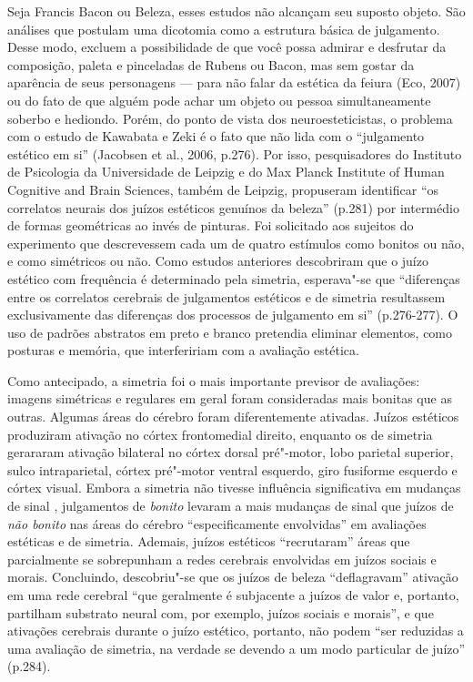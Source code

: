 Seja Francis Bacon ou Beleza, esses estudos não alcançam seu suposto
objeto. São análises que postulam uma dicotomia como a estrutura básica
de julgamento. Desse modo, excluem a possibilidade de que você possa
admirar e desfrutar da composição, paleta e pinceladas de Rubens ou
Bacon, mas sem gostar da aparência de seus personagens --- para não
falar da estética da feiura (Eco, 2007) ou do fato de que alguém pode
achar um objeto ou pessoa simultaneamente soberbo e hediondo. Porém, do
ponto de vista dos neuroesteticistas, o problema com o estudo de
Kawabata e Zeki é o fato que não lida com o ``julgamento estético em
si'' (Jacobsen et al., 2006, p.276). Por isso, pesquisadores do
Instituto de Psicologia da Universidade de Leipzig e do Max Planck
Institute of Human Cognitive and Brain Sciences, também de Leipzig,
propuseram identificar ``os correlatos neurais dos juízos estéticos
genuínos da beleza'' (p.281) por intermédio de formas geométricas ao
invés de pinturas. Foi solicitado aos sujeitos do experimento que
descrevessem cada um de quatro estímulos como bonitos ou não, e como
simétricos ou não. Como estudos anteriores descobriram que o juízo
estético com frequência é determinado pela simetria, esperava"-se que
``diferenças entre os correlatos cerebrais de julgamentos estéticos e de
simetria resultassem exclusivamente das diferenças dos processos de
julgamento em si'' (p.276-277). O uso de padrões abstratos em preto e
branco pretendia eliminar elementos, como posturas e memória, que
interfeririam com a avaliação estética.

Como antecipado, a simetria foi o mais importante previsor de
avaliações: imagens simétricas e regulares em geral foram consideradas
mais bonitas que as outras. Algumas áreas do cérebro foram
diferentemente ativadas. Juízos estéticos produziram ativação no córtex
frontomedial direito, enquanto os de simetria gerararam ativação
bilateral no córtex dorsal pré"-motor, lobo parietal superior, sulco
intraparietal, córtex pré"-motor ventral esquerdo, giro fusiforme
esquerdo e córtex visual. Embora a simetria não tivesse influência
significativa em mudanças de sinal , julgamentos de \emph{bonito}
levaram a mais mudanças de sinal que juízos de \emph{não bonito} nas
áreas do cérebro ``especificamente envolvidas'' em avaliações estéticas
e de simetria. Ademais, juízos estéticos ``recrutaram'' áreas que
parcialmente se sobrepunham a redes cerebrais envolvidas em juízos
sociais e morais. Concluindo, descobriu"-se que os juízos de beleza
``deflagravam'' ativação em uma rede cerebral ``que geralmente é
subjacente a juízos de valor e, portanto, partilham substrato neural
com, por exemplo, juízos sociais e morais'', e que ativações cerebrais
durante o juízo estético, portanto, não podem ``ser reduzidas a uma
avaliação de simetria, na verdade se devendo a um modo particular de
juízo'' (p.284).

